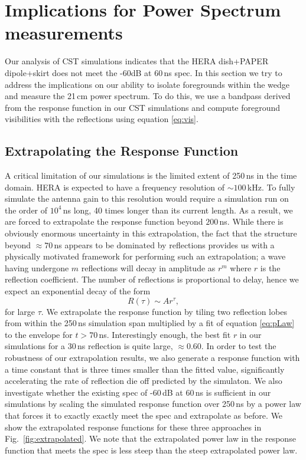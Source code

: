 \documentclass[useAMS,usenatbib]{mn2e}
\begin{document}
\section{Implications for Power Spectrum measurements}


Our analysis of CST simulations indicates that the HERA dish+PAPER dipole+skirt does not meet the -60dB at 60\,ns spec. In this section we try to address the implications on our ability to isolate foregrounds within the wedge and measure the 21\,cm power spectrum. To do this, we use a bandpass derived from the response function in our CST simulations and compute foreground visibilities with the reflections using equation \ref{eq:vis}. 

\subsection{Extrapolating the Response Function}

A critical limitation of our simulations is the limited extent of 250\,ns in the time domain. HERA is expected to have a frequency resolution of $\sim 100$\,kHz. To fully simulate the antenna gain to this resolution would require a simulation run on the order of $10^4$\,ns long, 40 times longer than its current length. As a result, we are forced to extrapolate the response function beyond $200$\,ns. While there is obviously enormous uncertainty in this extrapolation, the fact that the structure beyond $\approx 70$\,ns appears to be dominated by reflections provides us with a physically motivated framework for performing such an extrapolation; a wave having undergone $m$ reflections will decay in amplitude as $r^m$ where $r$ is the reflection coefficient. The number of reflections is proportional to delay, hence we  expect an exponential decay of the form
\begin{equation}\label{eq:pLaw}
R(\tau) \sim A r^\tau,
\end{equation}
for large $\tau$. We extrapolate the response function by tiling two reflection lobes from within the 250\,ns simulation span multiplied by a fit of equation \ref{eq:pLaw} to  the envelope for $t>70$\,ns. Interestingly enough, the best fit $r$ in our simulations for a 30\,ns reflection is quite large, $\approx 0.60$. In order to test the robustness of our extrapolation results, we also generate a response function with a time constant that is three times smaller than the fitted value, significantly accelerating the rate of reflection die off predicted by the simulaton. We also investigate whether the existing spec of -60\,dB at 60\,ns is sufficient in our simulations by scaling the simulated response function over 250\,ns by a power law that forces it to exactly exactly meet the spec and extrapolate as before. We show the extrapolated response functions for these three approaches in Fig.~\ref{fig:extrapolated}. We note that the extrapolated power law in the response function that meets the spec is less steep than the steep extrapolated power law. 
\end{document}
